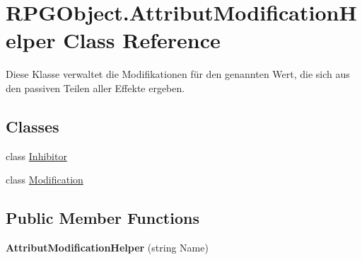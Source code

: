 \hypertarget{class_r_p_g_object_1_1_attribut_modification_helper}{}\section{R\+P\+G\+Object.\+Attribut\+Modification\+Helper Class Reference}
\label{class_r_p_g_object_1_1_attribut_modification_helper}


Diese Klasse verwaltet die Modifikationen für den genannten Wert, die sich aus den passiven Teilen aller Effekte ergeben.  


\subsection*{Classes}
\begin{DoxyCompactItemize}
\item 
class \hyperlink{class_r_p_g_object_1_1_attribut_modification_helper_1_1_inhibitor}{Inhibitor}
\item 
class \hyperlink{class_r_p_g_object_1_1_attribut_modification_helper_1_1_modification}{Modification}
\end{DoxyCompactItemize}
\subsection*{Public Member Functions}
\begin{DoxyCompactItemize}
\item 
\hypertarget{class_r_p_g_object_1_1_attribut_modification_helper_a77b155c4033c277b394c6d6fa9017788}{}{\bfseries Attribut\+Modification\+Helper} (string Name)\label{class_r_p_g_object_1_1_attribut_modification_helper_a77b155c4033c277b394c6d6fa9017788}

\end{DoxyCompactItemize}
